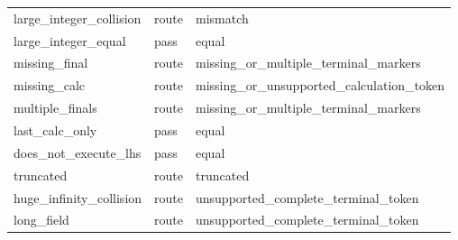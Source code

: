 \documentclass[journal,onecolumn]{IEEEtran}
\begin{document}
\begin{table}[H]
\begin{tabular}{@{}lll@{}}
large\_\allowbreak integer\_\allowbreak collision & route & mismatch\\
large\_\allowbreak integer\_\allowbreak equal & pass & equal\\
missing\_\allowbreak final & route & missing\_\allowbreak or\_\allowbreak multiple\_\allowbreak terminal\_\allowbreak markers\\
missing\_\allowbreak calc & route & missing\_\allowbreak or\_\allowbreak unsupported\_\allowbreak calculation\_\allowbreak token\\
multiple\_\allowbreak finals & route & missing\_\allowbreak or\_\allowbreak multiple\_\allowbreak terminal\_\allowbreak markers\\
last\_\allowbreak calc\_\allowbreak only & pass & equal\\
does\_\allowbreak not\_\allowbreak execute\_\allowbreak lhs & pass & equal\\
truncated & route & truncated\\
huge\_\allowbreak infinity\_\allowbreak collision & route & unsupported\_\allowbreak complete\_\allowbreak terminal\_\allowbreak token\\
long\_\allowbreak field & route & unsupported\_\allowbreak complete\_\allowbreak terminal\_\allowbreak token\\
\bottomrule
\end{tabular}
\end{table}
\end{document}
